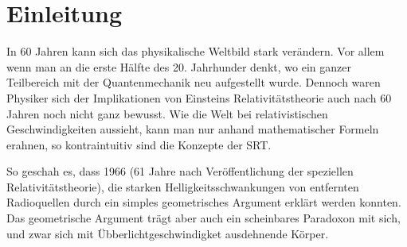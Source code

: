 \section{Einleitung}
\label{sec:einleitung}
In 60 Jahren kann sich das physikalische Weltbild stark verändern. Vor allem wenn man an die erste Hälfte des 20. Jahrhunder denkt, wo ein ganzer Teilbereich mit der Quantenmechanik neu aufgestellt wurde. Dennoch waren Physiker sich der Implikationen von Einsteins  Relativitätstheorie auch nach 60 Jahren noch nicht ganz bewusst. Wie die Welt bei relativistischen Geschwindigkeiten aussieht, kann man nur anhand mathematischer Formeln erahnen, so kontraintuitiv sind die Konzepte der SRT.

So geschah es, dass 1966 (61 Jahre nach Veröffentlichung der speziellen Relativitätstheorie), die starken Helligkeitsschwankungen von entfernten Radioquellen durch ein simples geometrisches Argument erklärt werden konnten. 
Das geometrische Argument trägt aber auch ein scheinbares Paradoxon mit sich, und zwar sich mit Übberlichtgeschwindigket ausdehnende Körper.
